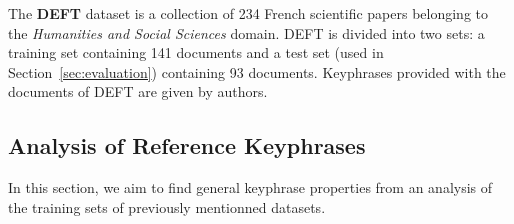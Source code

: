     The \textbf{DEFT} dataset \cite{Paroubek2012deft} is a collection of 234
    French scientific papers belonging to the \textit{Humanities and Social
    Sciences} domain. DEFT is divided into two sets: a training set containing
    141 documents and a test set (used in Section~\ref{sec:evaluation})
    containing 93 documents. Keyphrases provided with the documents of DEFT are
    given by authors.

  \subsection{Analysis of Reference Keyphrases}
  \label{subsec:keyphrase_analysis}
    In this section, we aim to find general keyphrase properties from an
    analysis of the training sets of previously mentionned datasets.

